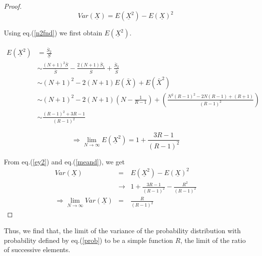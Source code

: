 \begin{multicols}{2}
\vspace{-.6cm}

\begin{proof}\renewcommand{\qedsymbol}{}
\begin{equation}
Var(\underline{X}) = E(\underline{X}^2) - E(\underline{X})^2\label{eq-7.4}
\end{equation}

Using eq.(\ref{n2fnd}) we first obtain $E(\underline{X}^2)$.

\vspace{-.5cm}

{\fontsize{6}{7}\selectfont
\begin{align}
E(\underline{X}^2) &= \frac{\bar{S}_2}{\underline{S}} \nonumber\\
&\sim \frac{(N+1)^2\bar{S}}{\bar{S}} - \frac{2(N+1)\bar{S}_1}{\bar{S}} + \frac{\bar{S}_2}{\bar{S}}\nonumber\\
&\sim (N+1)^2 - 2(N+1)E(\bar{X}) +E(\bar{X}^2)\nonumber\\
&\sim (N+1)^2 - 2(N+1)\left(N-\frac{1}{R-1}\right) + \left(\frac{N^2(R-1)^2 - 2N(R-1)+(R+1)}{(R-1)^2}\right)\nonumber\\
&\sim \frac{(R-1)^2 +3R -1}{(R-1)^2}\nonumber
\end{align}}

\vspace{-1cm}

\begin{equation}
\Rightarrow \lim_{N \rightarrow \infty}E(\underline{X}^2) = 1 + \displaystyle{\frac{3R-1}{(R-1)^2}}\label{eq-7.5}
\end{equation} 

From eq.(\ref{ey2}) and eq.(\ref{meand}), we get 
\begin{align}
Var(\underline{X}) &=& E(\underline{X}^2) - E(\underline{X})^2\nonumber\\
&\rightarrow& 1 + \frac{3R-1}{(R-1)^2} - \frac{R^2}{(R-1)^2}\nonumber\\ 
\Rightarrow \lim_{N \rightarrow \infty}Var(\underline{X}) &=& \frac{R}{(R-1)^2}\label{eq-7.6}
\end{align}
\end{proof}

\vspace{-1cm}

Thus, we find that, the limit of the variance of the probability distribution with probability defined by eq.(\ref{prob}) to be a simple function $R$, the limit of the ratio of successive elements.


\end{multicols}
